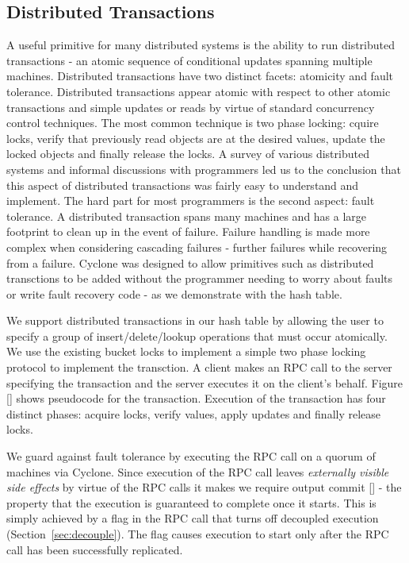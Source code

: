 \documentclass[twocolumn]{article}
\begin{document}
\subsection{Distributed Transactions}
A useful primitive for many distributed systems is the ability to run
distributed transactions - an atomic sequence of conditional updates spanning
multiple machines. Distributed transactions have two distinct facets:
atomicity and fault tolerance. Distributed transactions appear atomic with
respect to other atomic transactions and simple updates or reads by virtue of
standard concurrency control techniques. The most common technique is two phase
locking: cquire locks, verify that previously read objects are at the desired
values, update the locked objects and finally release the locks. A survey of
various distributed systems and informal discussions with programmers led us to
the conclusion that this aspect of distributed transactions was fairly easy to
understand and implement. The hard part for most programmers is the second
aspect: fault tolerance. A distributed transaction spans many machines and has a
large footprint to clean up in the event of failure. Failure handling is made
more complex when considering cascading failures - further failures while
recovering from a failure. Cyclone was designed to allow primitives such as
distributed transctions to be added without the programmer needing to worry
about faults or write fault recovery code - as we demonstrate with the hash
table.

We support distributed transactions in our hash table by allowing the user to
specify a group of insert/delete/lookup operations that must occur
atomically. We use the existing bucket locks to implement a simple two phase
locking protocol to implement the transction. A client makes an RPC call to the
server specifying the transaction and the server executes it on the client's
behalf. Figure [] shows pseudocode for the transaction. Execution of the
transaction has four distinct phases: acquire locks, verify values, apply
updates and finally release locks.

We guard against fault tolerance by executing the RPC call on a quorum of
machines via Cyclone. Since execution of the RPC call leaves \emph{externally
  visible side effects} by virtue of the RPC calls it makes we require output
commit [] - the property that the execution is guaranteed to complete once it
starts. This is simply achieved by a flag in the RPC call that turns off
decoupled execution (Section~\ref{sec:decouple}). The flag causes execution to
start only after the RPC call has been successfully replicated.
\end{document}
